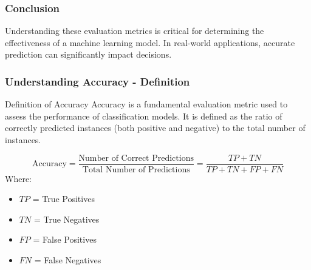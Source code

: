\documentclass[aspectratio=169]{beamer}
\begin{document}
\begin{frame}[fragile]
    \frametitle{Conclusion}
    \begin{block}{}
        Understanding these evaluation metrics is critical for determining the effectiveness of a machine learning model. In real-world applications, accurate prediction can significantly impact decisions.
    \end{block}
\end{frame}

\begin{frame}[fragile]
    \frametitle{Understanding Accuracy - Definition}
    \begin{block}{Definition of Accuracy}
        Accuracy is a fundamental evaluation metric used to assess the performance of classification models. 
        It is defined as the ratio of correctly predicted instances (both positive and negative) to the total number of instances.
    \end{block}
    \begin{equation}
        \text{Accuracy} = \frac{\text{Number of Correct Predictions}}{\text{Total Number of Predictions}} = \frac{TP + TN}{TP + TN + FP + FN}
    \end{equation}
    Where: 
    \begin{itemize}
        \item \(TP\) = True Positives
        \item \(TN\) = True Negatives
        \item \(FP\) = False Positives
        \item \(FN\) = False Negatives
    \end{itemize}
\end{frame}
\end{document}
